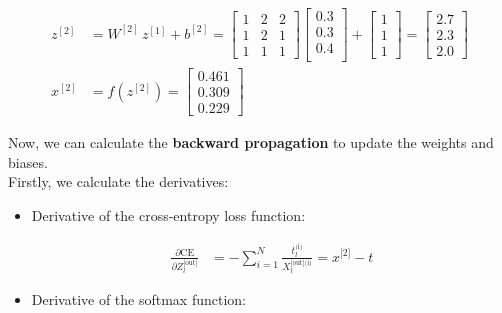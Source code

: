 \documentclass[12pt]{article}
\begin{document}
\begin{enumerate}
\begin{equation*}
    \begin{aligned}
        z^{[2]} &= W^{[2]} \, z^{[1]} + b^{[2]} = \begin{bmatrix}
            1 & 2 & 2 \\
            1 & 2 & 1 \\
            1 & 1 & 1
        \end{bmatrix} \begin{bmatrix}
            0.3 \\  
            0.3 \\
            0.4 \\
        \end{bmatrix} + \begin{bmatrix}
            1 \\
            1 \\
            1
        \end{bmatrix} = \begin{bmatrix}
            2.7 \\
            2.3 \\
            2.0
        \end{bmatrix} \\
        x^{[2]} &= f\left(z^{[2]}\right) = \begin{bmatrix}
            0.461 \\
            0.309 \\
            0.229
        \end{bmatrix}
    \end{aligned}
\end{equation*}


Now, we can calculate the \textbf{backward propagation} to update the weights and biases.\\
Firstly, we calculate the derivatives:

\begin{itemize}
    \item Derivative of the cross-entropy loss function:
    
    \begin{equation*}
        \begin{aligned}
            \frac{\partial \text{CE}}{\partial Z_{l}^{\text{[out]}}} &= -\sum_{i=1}^{N} \frac{t_{l}^{\text{(i)}}}{X_{l}^{\text{[out](i)}}} = x^{\text{[2]}} - t
        \end{aligned}
    \end{equation*}

    \item Derivative of the softmax function:
    

\end{itemize}
\end{enumerate}
\end{document}
